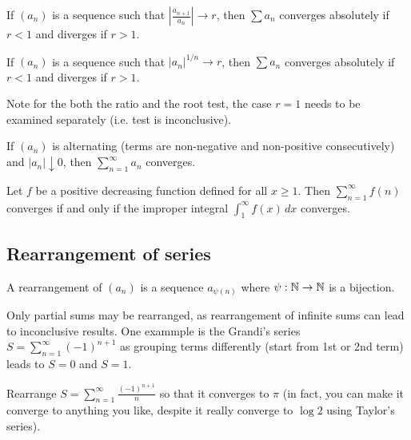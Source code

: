 \documentclass[11pt]{article}
\begin{document}
\begin{theorem}
  If \((a_n)\) is a sequence such that \(\left|\frac{a_{n+1}}{a_n}\right|\to r\), then \(\sum a_n\) converges absolutely if \(r<1\) and diverges if \(r>1\).
\end{theorem}

\begin{theorem}
  If \((a_n)\) is a sequence such that \(|a_n|^{1/n}\to r\), then \(\sum a_n\) converges absolutely if \(r<1\) and diverges if \(r>1\).
\end{theorem}
Note for the both the ratio and the root test, the case \(r=1\) needs to be examined separately (i.e. test is inconclusive).

\begin{theorem}
  If \((a_n)\) is alternating (terms are non-negative and non-positive consecutively) and \(|a_n|\downarrow 0\), then \(\sum_{n=1}^\infty a_n\) converges.
\end{theorem}

\begin{theorem}
  Let \(f\) be a positive decreasing function defined for all \(x\geq 1\). Then \(\sum_{n=1}^\infty f(n)\) converges if and only if the improper integral \(\int_{1}^{\infty}f(x)\,dx\) converges.
\end{theorem}

\subsection{Rearrangement of series}

\begin{definition}
  A rearrangement of \((a_n)\) is a sequence \(a_{\psi(n)}\) where \(\psi:\mathbb{N}\to\mathbb{N}\) is a bijection.
\end{definition}

\begin{example}
  Only partial sums may be rearranged, as rearrangement of infinite sums can lead to inconclusive results. One exammple is the Grandi's series \(S=\sum_{n=1}^{\infty}(-1)^{n+1}\) as grouping terms differently (start from 1st or 2nd term) leads to \(S=0\) and \(S=1\).
\end{example}

\begin{exercise}
  Rearrange \(S=\sum_{n=1}^{\infty}\frac{(-1)^{n+1}}{n}\) so that it converges to \(\pi\) (in fact, you can make it converge to anything you like, despite it really converge to \(\log 2\) using Taylor's series).
\end{exercise}
\end{document}
